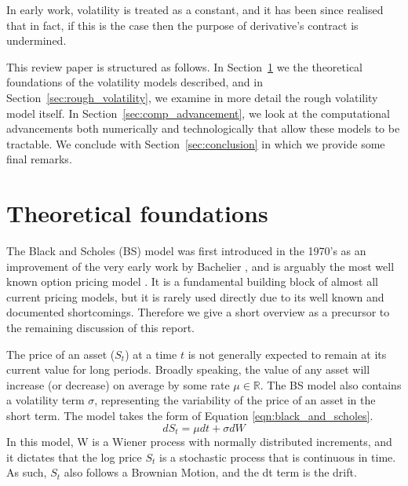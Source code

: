 \documentclass[12pt,oneside]{article}
\begin{document}
In early work, volatility is treated as a constant, and it has been since realised that in fact, if this is the case then the purpose of derivative's contract is undermined. 


This review paper is structured as follows. In Section~\ref{sec:black_scholes_foundations} we the theoretical foundations of the volatility models described, and in Section~\ref{sec:rough_volatility}, we examine in more detail the rough volatility model itself. In Section~\ref{sec:comp_advancement}, we look at the computational advancements both numerically and technologically that allow these models to be tractable. We conclude with Section~\ref{sec:conclusion} in which we provide some final remarks.

\section{Theoretical foundations}
\label{sec:black_scholes_foundations}
The Black and Scholes (BS) model was first introduced in the 1970's as an improvement of the very early work by Bachelier \cite{Bachelier1900}, and is arguably the most well known option pricing model \cite{BlackScholes1973}. It is a fundamental building block of almost all current pricing models, but it is rarely used directly due to its well known and documented shortcomings. Therefore we give a short overview as a precursor to the remaining discussion of this report.

The price of an asset ($S_t$) at a time $t$ is not generally expected to remain at its current value for long periods. Broadly speaking, the value of any asset will increase (or decrease) on average by some rate $\mu\in\mathbb{R}$. The BS model also contains a volatility term $\sigma$, representing the variability of the price of an asset in the short term. The model takes the form of Equation \ref{eqn:black_and_scholes}.
\begin{equation}
\label{eqn:black_and_scholes} 
dS_t=\mu dt + \sigma dW
\end{equation}
In this model, W is a Wiener process with normally distributed increments, and it dictates that the log price $S_t$ is a stochastic process that is continuous in time. As such, $S_t$ also follows a Brownian Motion, and the dt term is the drift. 
\end{document}

